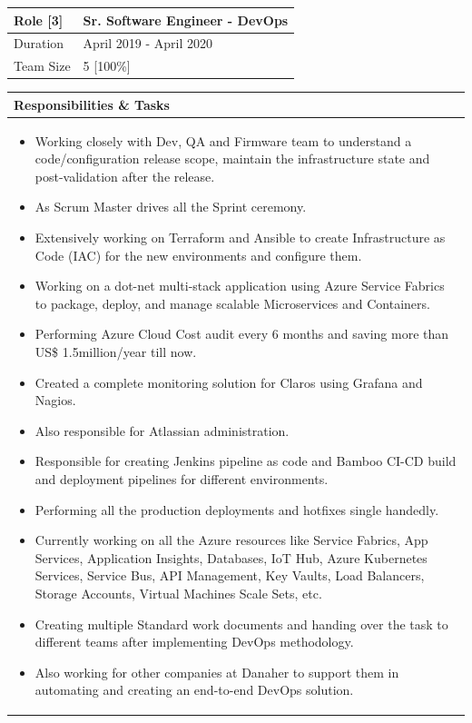 \documentclass[12pt, a4paper]{article}
\begin{document}
\noindent\begin{tabular}{|p{1.5in}|p{5.45in}|}
\hline
\rowcolor{black!20} Role [3] & Sr. Software Engineer - DevOps\\
\hline
Duration & April 2019 - April 2020\\
\hline
Team Size & 5 [100\%]\\
\hline
\end{tabular}
\newline
\vspace*{1mm}
\newline
\begin{tabular}{|p{7.122in}|}
\hline
\rowcolor{black!5} Responsibilities \& Tasks\\
\hline
\begin{itemize}[noitemsep, nolistsep]
\item Working closely with Dev, QA and Firmware team to understand a code/configuration release scope, maintain the infrastructure state and post-validation after the release.
\item As Scrum Master drives all the Sprint ceremony.
\item Extensively working on Terraform and Ansible to create Infrastructure as Code (IAC) for the new environments and configure them.
\item Working on a dot-net multi-stack application using Azure Service Fabrics to package, deploy, and manage scalable Microservices and Containers.
\item Performing Azure Cloud Cost audit every 6 months and saving more than US\$ 1.5million/year till now.
\item Created a complete monitoring solution for Claros using Grafana and Nagios.
\item Also responsible for Atlassian administration. 
\item Responsible for creating Jenkins pipeline as code and Bamboo CI-CD build and deployment pipelines for different environments.
\item Performing all the production deployments and hotfixes single handedly.
\item Currently working on all the Azure resources like Service Fabrics, App Services, Application Insights, Databases, IoT Hub, Azure Kubernetes Services, Service Bus, API Management, Key Vaults, Load Balancers, Storage Accounts, Virtual Machines Scale Sets, etc.
\item Creating multiple Standard work documents and handing over the task to different teams after implementing DevOps methodology.
\item Also working for other companies at Danaher to support them in automating and creating an end-to-end DevOps solution.
\end{itemize} \\
\hline
\end{tabular}
\end{document}
